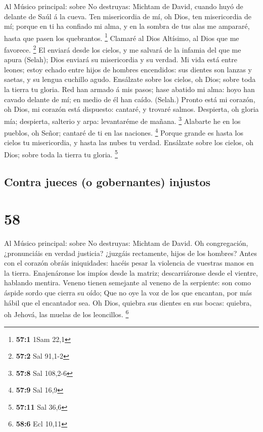  Al Músico principal: sobre No destruyas: Michtam de David,
cuando huyó de delante de Saúl á la cueva. Ten misericordia de mí, oh
Dios, ten misericordia de mí; porque en ti ha confiado mi alma, y en la
sombra de tus alas me ampararé, hasta que pasen los quebrantos.
\footnote{\textbf{57:1} 1Sam 22,1}  Clamaré al Dios
Altísimo, al Dios que me favorece. \footnote{\textbf{57:2} Sal 91,1-2}
 El enviará desde los cielos, y me salvará de la infamia del
que me apura (Selah); Dios enviará su misericordia y su verdad.
 Mi vida está entre leones; estoy echado entre hijos de
hombres encendidos: sus dientes son lanzas y saetas, y su lengua
cuchillo agudo.  Ensálzate sobre los cielos, oh Dios; sobre
toda la tierra tu gloria.  Red han armado á mis pasos; hase
abatido mi alma: hoyo han cavado delante de mí; en medio de él han
caído. (Selah.)  Pronto está mi corazón, oh Dios, mi corazón
está dispuesto: cantaré, y trovaré salmos.  Despierta, oh
gloria mía; despierta, salterio y arpa: levantaréme de mañana.
\footnote{\textbf{57:8} Sal 108,2-6}  Alabarte he en los
pueblos, oh Señor; cantaré de ti en las naciones. \footnote{\textbf{57:9}
  Sal 16,9}  Porque grande es hasta los cielos tu
misericordia, y hasta las nubes tu verdad.  Ensálzate sobre
los cielos, oh Dios; sobre toda la tierra tu gloria. \footnote{\textbf{57:11}
  Sal 36,6}

\hypertarget{contra-jueces-o-gobernantes-injustos}{%
\subsection{Contra jueces (o gobernantes)
injustos}\label{contra-jueces-o-gobernantes-injustos}}

\hypertarget{section-57}{%
\section{58}\label{section-57}}

 Al Músico principal: sobre No destruyas: Michtam de David.
Oh congregación, ¿pronunciáis en verdad justicia? ¿juzgáis rectamente,
hijos de los hombres?  Antes con el corazón obráis
iniquidades: hacéis pesar la violencia de vuestras manos en la tierra.
 Enajenáronse los impíos desde la matriz; descarriáronse
desde el vientre, hablando mentira.  Veneno tienen semejante
al veneno de la serpiente: son como áspide sordo que cierra su oído;
 Que no oye la voz de los que encantan, por más hábil que el
encantador sea.  Oh Dios, quiebra sus dientes en sus bocas:
quiebra, oh Jehová, las muelas de los leoncillos. \footnote{\textbf{58:6}
  Ecl 10,11}

